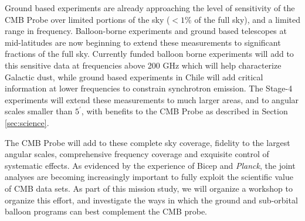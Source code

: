 Ground based experiments are already approaching the level of
sensitivity of the CMB Probe over limited portions of the sky ($<1$\%
of the full sky), and a limited range in frequency.
Balloon-borne experiments and ground based telescopes at
mid-latitudes are now beginning to extend these measurements to
significant fractions of the full sky. 
Currently funded balloon borne
experiments will add to this sensitive data at frequencies above 200
GHz which will help characterize Galactic dust, while ground based
experiments in Chile will add critical information at lower
frequencies to constrain synchrotron emission.
The Stage-4 experiments
will extend these measurements to much larger areas, and to angular
scales smaller than $5^\prime$, with benefits to the CMB Probe as
described in Section \ref{sec:science}.

The CMB Probe will add to these complete sky coverage, fidelity to the
largest angular scales, comprehensive frequency coverage and exquisite
control of systematic effects.  As evidenced by the experience of
Bicep and {\it Planck}, the joint analyses are becoming increasingly
important to fully exploit the scientific value of CMB data sets.  As
part of this mission study, we will organize a workshop to organize
this effort, and investigate the ways in which the ground and
sub-orbital balloon programs can best complement the CMB probe.
